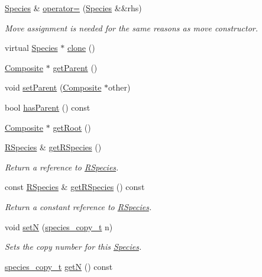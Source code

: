\begin{DoxyCompactItemize}
\hyperlink{classSpecies}{Species} \& \hyperlink{classSpecies_ac3f4cff8872442473bedcda82e5ef314}{operator=} (\hyperlink{classSpecies}{Species} \&\&rhs)
\begin{DoxyCompactList}\small\item\em Move assignment is needed for the same reasons as move constructor. \end{DoxyCompactList}\item 
virtual \hyperlink{classSpecies}{Species} $\ast$ \hyperlink{classSpecies_a5a7e96158d90d5f59f75c9e3405b54c6}{clone} ()
\item 
\hyperlink{classComposite}{Composite} $\ast$ \hyperlink{classSpecies_af24cab7cbaa561d35b08fef5faf05fdf}{get\+Parent} ()
\item 
void \hyperlink{classSpecies_acc64c5b61abf911872d433ac32b62de8}{set\+Parent} (\hyperlink{classComposite}{Composite} $\ast$other)
\item 
bool \hyperlink{classSpecies_a40262d7217fcc28a31682aee40a19232}{has\+Parent} () const 
\item 
\hyperlink{classComposite}{Composite} $\ast$ \hyperlink{classSpecies_a876c8a827476a11e05f3b7a7669c29b6}{get\+Root} ()
\item 
\hyperlink{classRSpecies}{R\+Species} \& \hyperlink{classSpecies_a048dd7bc3fecd08b1b1797dc83aa163d}{get\+R\+Species} ()
\begin{DoxyCompactList}\small\item\em Return a reference to \hyperlink{classRSpecies}{R\+Species}. \end{DoxyCompactList}\item 
const \hyperlink{classRSpecies}{R\+Species} \& \hyperlink{classSpecies_aa1069a34b360f84d186f48bd99f80971}{get\+R\+Species} () const 
\begin{DoxyCompactList}\small\item\em Return a constant reference to \hyperlink{classRSpecies}{R\+Species}. \end{DoxyCompactList}\item 
void \hyperlink{classSpecies_a88de7cf5130cb9cee2da3585374db654}{set\+N} (\hyperlink{common_8h_a3503f321fd36304ee274141275cca586}{species\+\_\+copy\+\_\+t} n)
\begin{DoxyCompactList}\small\item\em Sets the copy number for this \hyperlink{classSpecies}{Species}. \end{DoxyCompactList}\item 
\hyperlink{common_8h_a3503f321fd36304ee274141275cca586}{species\+\_\+copy\+\_\+t} \hyperlink{classSpecies_aea7327b3fed261c705b4d32b9973aa58}{get\+N} () const 

\end{DoxyCompactItemize}
